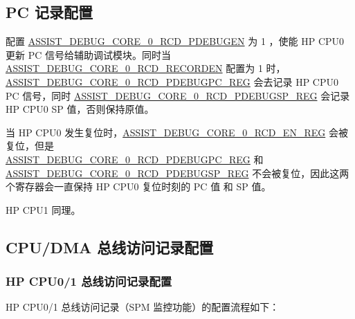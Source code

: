 \documentclass[main\_\_CN.tex]{subfiles}
\begin{document}
\subsection{PC 记录配置}

配置 \hyperref[fielddesc:ASSISTDEBUGCORE0RCDPDEBUGEN]{ASSIST\_DEBUG\_CORE\_0\_RCD\_PDEBUGEN} 为 1 ，使能 HP CPU0 更新 PC 信号给辅助调试模块。同时当 \hyperref[fielddesc:ASSISTDEBUGCORE0RCDRECORDEN]{ASSIST\_DEBUG\_CORE\_0\_RCD\_RECORDEN} 配置为 1 时，\\\hyperref[regdesc:ASSISTDEBUGCORE0RCDPDEBUGPCREG]{ASSIST\_DEBUG\_CORE\_0\_RCD\_PDEBUGPC\_REG} 会去记录 HP CPU0 PC 信号，同时 \hyperref[regdesc:ASSISTDEBUGCORE0RCDPDEBUGSPREG]{ASSIST\_DEBUG\_CORE\_0\_RCD\_PDEBUGSP\_REG} 会记录 HP CPU0 SP 值，否则保持原值。

当 HP CPU0 发生复位时，\hyperref[regdesc:ASSISTDEBUGCORE0RCDENREG]{ASSIST\_DEBUG\_CORE\_0\_RCD\_EN\_REG} 会被复位，但是\\ \hyperref[regdesc:ASSISTDEBUGCORE0RCDPDEBUGPCREG]{ASSIST\_DEBUG\_CORE\_0\_RCD\_PDEBUGPC\_REG} 和 \hyperref[regdesc:ASSISTDEBUGCORE0RCDPDEBUGSPREG]{ASSIST\_DEBUG\_CORE\_0\_RCD\_PDEBUGSP\_REG} 不会被复位，因此这两个寄存器会一直保持 HP CPU0 复位时刻的 PC 值 和 SP 值。

HP CPU1 同理。


\subsection{CPU/DMA 总线访问记录配置}

\subsubsection{HP CPU0/1 总线访问记录配置}
\label{sec:hp_cpu_access_mon}

HP CPU0/1 总线访问记录（SPM 监控功能）的配置流程如下：
\end{document}

